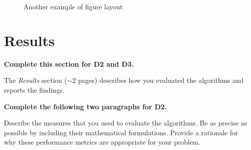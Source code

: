 \documentclass[letterpaper]{article} %
\begin{document}

\begin{figure}[t!]
\centering
{}\hfill
{}\hfill
{}\hfill
{}\hfill
\caption{Another example of figure layout}
\label{fig:figures_across}
\end{figure}


\section{Results}

{\bf Complete this section for D2 and D3.}

The {\it Results} section ($\sim$2 pages) describes how you evaluated the algorithms and reports the findings.  

{\bf Complete the following two paragraphs for D2.}

Describe the measures that you used to evaluate the algorithms.  Be as precise as possible by including their mathematical formulations.  Provide a rationale for why these performance metrics are appropriate for your problem.
\end{document}
